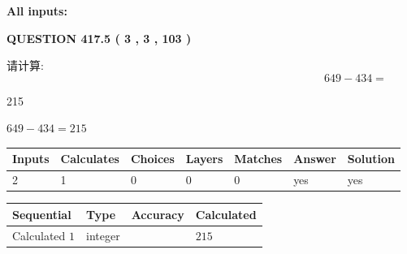 \documentclass{ctexart}
\begin{document}
   
   
   
\noindent\vspace{0.1in}\hspace{-0.08in} {\textbf{\Large{All inputs: }}}
   
   
  
\vspace{0.2in}
  
{\textbf{\Large{QUESTION
417.5 
 ( 3 , 3 , 103 )
}}}
  
  
 
请计算:
\begin{equation}
649 -   %
434 = \nonumber
\end{equation}
 
 
 
\noindent{}
 
 

215
 
 
\noindent{}
 
 

 
 
 
\noindent{}
 
 

$ %
649 -  %
434=   %
215$
 
 
\noindent{}
 
 

 
   
   
   
   
\noindent\begin{tabular}{|l|l|l|l|l|l|l|}
 \hline
Inputs & Calculates & Choices & Layers & Matches & Answer & Solution \\ \hline
 2  & 
 1  & 
 0
  & 
 0  & 
 0  & 
  yes & 
  yes 
  \\ \hline
 \end{tabular}
   
   
   
   
\noindent{}
   
   
  
  
\noindent\begin{tabular}{|l|l|l|l|}
\hline
 Sequential & Type & Accuracy & Calculated \\ 
\hline
 
 
  Calculated $  1 $ & integer &  & 
  $ 215 $ 
 \\  \hline  
 \end{tabular}
   
\end{document}
